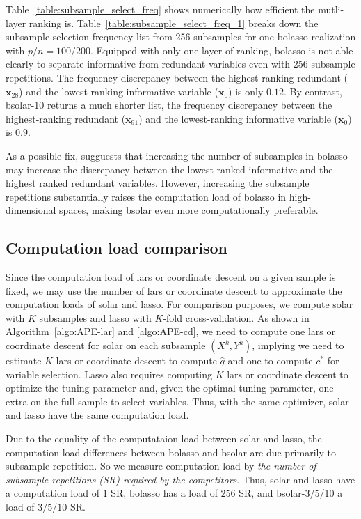 \documentclass[12pt]{article}
\begin{document}
Table~\ref{table:subsample_select_freq} shows numerically how efficient the mutli-layer ranking is. Table~\ref{table:subsample_select_freq_1} breaks down the subsample selection frequency list from 256 subsamples for one bolasso realization with $p/n=100/200$. Equipped with only one layer of ranking, bolasso is not able clearly to separate informative from redundant variables even with 256 subsample repetitions. The frequency discrepancy between the highest-ranking redundant ($\mathbf{x}_{28}$) and the lowest-ranking informative variable ($\mathbf{x}_0$) is only $0.12$. By contrast, bsolar-10 returns a much shorter list, the frequency discrepancy between the highest-ranking redundant ($\mathbf{x}_{91}$) and the lowest-ranking informative variable ($\mathbf{x}_0$) is $0.9$.

As a possible fix, \citet{bach2008bolasso} sugguests that increasing the number of subsamples in bolasso may increase the discrepancy between the lowest ranked informative and the highest ranked redundant variables. However, increasing the subsample repetitions substantially raises the computation load of bolasso in high-dimensional spaces, making bsolar even more computationally preferable.

\subsection{Computation load comparison \label{subsection:comp}}

Since the computation load of lars or coordinate descent on a given sample is fixed, we may use the number of lars or coordinate descent to approximate the computation loads of solar and lasso. For comparison purposes, we compute solar with $K$ subsamples and lasso with $K$-fold cross-validation. As shown in Algorithm~\ref{algo:APE-lar} and \ref{algo:APE-cd}, we need to compute one lars or coordinate descent for solar on each subsample $(X^k, Y^k)$, implying we need to estimate $K$ lars or coordinate descent to compute $\widehat{q}$ and one to compute $c^*$ for variable selection. Lasso also requires computing $K$ lars or coordinate descent to optimize the tuning parameter and, given the optimal tuning parameter, one extra on the full sample to select variables. Thus, with the same optimizer, solar and lasso have the same computation load.

Due to the equality of the computataion load between solar and lasso, the computation load differences between bolasso and bsolar are due primarily to subsample repetition. So we measure computation load by \emph{the number of subsample repetitions (SR) required by the competitors}. Thus, solar and lasso have a computation load of $1$ SR, bolasso has a load of $256$ SR, and bsolar-3/5/10 a load of $3/5/10$ SR.
\end{document}
